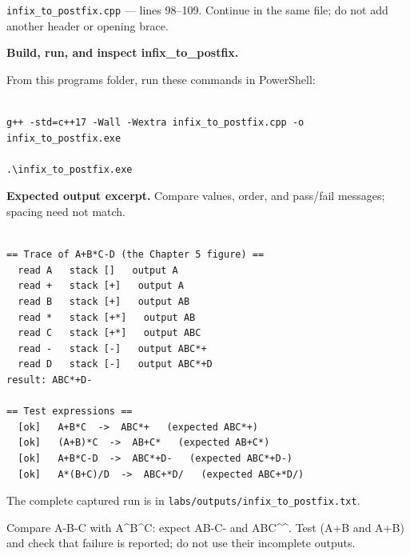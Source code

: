 \texttt{infix\_to\_postfix.cpp} --- lines 98--109. Continue in the same file; do not add another header or opening brace.




\tcbbreak

\textbf{Build, run, and inspect infix\_to\_postfix.}

From this program\textquotesingle s folder, run these commands in PowerShell:

\begin{lstlisting}[style=utpterminal,language={}]

g++ -std=c++17 -Wall -Wextra infix_to_postfix.cpp -o infix_to_postfix.exe

.\infix_to_postfix.exe

\end{lstlisting}

\textbf{Expected output excerpt.} Compare values, order, and pass/fail messages; spacing need not match.

\begin{lstlisting}[style=utpterminal,language={}]

== Trace of A+B*C-D (the Chapter 5 figure) ==
  read A   stack []   output A
  read +   stack [+]   output A
  read B   stack [+]   output AB
  read *   stack [+*]   output AB
  read C   stack [+*]   output ABC
  read -   stack [-]   output ABC*+
  read D   stack [-]   output ABC*+D
result: ABC*+D-

== Test expressions ==
  [ok]   A+B*C  ->  ABC*+   (expected ABC*+)
  [ok]   (A+B)*C  ->  AB+C*   (expected AB+C*)
  [ok]   A+B*C-D  ->  ABC*+D-   (expected ABC*+D-)
  [ok]   A*(B+C)/D  ->  ABC+*D/   (expected ABC+*D/)

\end{lstlisting}

The complete captured run is in \texttt{labs/outputs/infix\_to\_postfix.txt}.

\begin{tryit}

Compare A-B-C with A\textasciicircum{}B\textasciicircum{}C: expect AB-C- and ABC\textasciicircum{}\textasciicircum{}. Test (A+B and A+B) and check that failure is reported; do not use their incomplete outputs.

\end{tryit}
